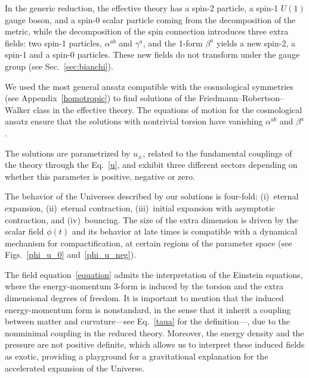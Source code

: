 \documentclass[aps,prd,12pt,superscriptaddress,showpacs,showkeys,longbibliography,reprint,nofootinbib]{revtex4-1}
\begin{document}
In the generic reduction, the effective theory has a spin-2 particle, a spin-1 $U(1)$ gauge boson, and a spin-0 scalar particle coming from the decomposition of the metric, while the decomposition of the spin connection introduces three extra fields: two spin-1 particles, $\alpha^{ab}$ and $\gamma^a$, and the 1-form $\beta^a$ yields a new spin-2, a spin-1 and a spin-0 particles. These new fields do not transform under the gauge group (see Sec.~\ref{sec:bianchi}).

We used the most general ansatz compatible with the cosmological symmetries (see Appendix~\ref{homotropic}) to find solutions of the Friedmann--Robertson--Walker class in the effective theory. The equations of motion for the cosmological ansatz ensure that the solutions with nontrivial torsion have vanishing $\alpha^{ab}$ and $\beta^a$.

The solutions are parametrized by $u_\pm$, related to the fundamental couplings of the theory through the Eq.~\eqref{u}, and exhibit three different sectors depending on whether this parameter is positive, negative or zero.

The behavior of the Universes described by our solutions is four-fold: (i)~eternal expansion, (ii)~eternal contraction, (iii)~initial expansion with asymptotic contraction, and (iv)~bouncing. %
The size of the extra dimension is driven by the scalar field $\phi(t)$ and its behavior at late times is compatible with a dynamical mechanism for compactification, at certain regions of the parameter space (see Figs.~\ref{phi_u_0} and~\ref{phi_u_neg}). 

The field equation~\eqref{equation} admits the interpretation of the Einstein equations, where the energy-momentum $3$-form is induced by the torsion and the extra dimensional degrees of freedom. It is important to mention that the induced energy-momentum form is nonstandard, in the sense that it inherit a coupling between matter and curvature---see Eq.~\eqref{taua} for the definition---, due to the nonminimal coupling in the reduced theory. Moreover, the energy density and the pressure are not positive definite, which allows us to interpret these induced fields as exotic, providing a playground for a gravitational explanation for the accelerated expansion of the Universe.
\end{document}
